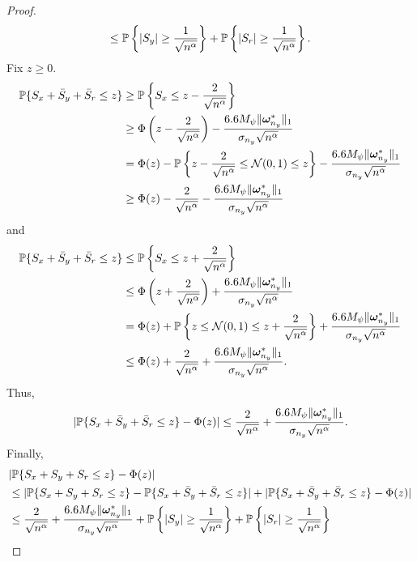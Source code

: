 \documentclass[11pt]{article}
\numberwithin{equation}{section}
\numberwithin{theorem}{section}
\def\fatomega{\boldsymbol{\omega}}
\theoremstyle{definition}
\theoremstyle{remark}
\begin{document}
\begin{proof}
\begin{equation}
\leq \mathbb{P}\left\{ |S_y| \geq \frac{1}{\sqrt{n^\alpha}} \right\} + \mathbb{P}\left\{ |S_r|
\geq \frac{1}{\sqrt{n^\alpha}} \right\}.
\end{equation}
Fix $z \geq 0$.
\begin{equation}
\begin{aligned}
\PP\{ S_x + \bar S_y + \bar S_r \leq z \}
&\geq \PP\left\{ S_x \leq z - \frac{2}{\sqrt{n^\alpha}} \right\} \\
&\geq \Phi\left(z - \frac{2}{\sqrt{n^\alpha}} \right) - \frac{6.6 M_\psi \|\fatomega_{n_y}^*\|_1}{\sigma_{n_y} \sqrt{n^\alpha}} \\
&= \Phi(z) - \PP\left\{ z - \frac{2}{\sqrt{n^\alpha}} \leq \Ncal(0,1) \leq z \right\} - \frac{6.6 M_\psi \|\fatomega_{n_y}^*\|_1}{\sigma_{n_y} \sqrt{n^\alpha}} \\
&\geq \Phi(z) - \frac{2}{\sqrt{n^\alpha}} - \frac{6.6 M_\psi \|\fatomega_{n_y}^*\|_1}{\sigma_{n_y} \sqrt{n^\alpha}}
\end{aligned}
\end{equation}
and
\begin{equation}
\begin{aligned}
\PP\{ S_x + \bar S_y + \bar S_r \leq z \}
&\leq \PP\left\{ S_x \leq z + \frac{2}{\sqrt{n^\alpha}} \right\} \\
&\leq \Phi\left(z + \frac{2}{\sqrt{n^\alpha}} \right) + \frac{6.6 M_\psi \|\fatomega_{n_y}^*\|_1}{\sigma_{n_y} \sqrt{n^\alpha}} \\
&= \Phi(z) + \PP\left\{ z \leq \Ncal(0,1) \leq z + \frac{2}{\sqrt{n^\alpha}} \right\} + \frac{6.6 M_\psi \|\fatomega_{n_y}^*\|_1}{\sigma_{n_y} \sqrt{n^\alpha}} \\
&\leq \Phi(z) + \frac{2}{\sqrt{n^\alpha}} + \frac{6.6 M_\psi \|\fatomega_{n_y}^*\|_1}{\sigma_{n_y} \sqrt{n^\alpha}}.
\end{aligned}
\end{equation}
Thus,
\begin{equation}
|\PP\{ S_x + \bar S_y + \bar S_r \leq z \} - \Phi(z)|
\leq \frac{2}{\sqrt{n^\alpha}} + \frac{6.6 M_\psi \|\fatomega_{n_y}^*\|_1}{\sigma_{n_y} \sqrt{n^\alpha}}.
\end{equation}
Finally,
\begin{equation}
\begin{aligned}
& |\PP\{ S_x + S_y + S_r \leq z \} - \Phi(z)| \\
&\leq |\PP\{ S_x + S_y + S_r \leq z \} - \PP\{ S_x + \bar S_y + \bar S_r \leq z \}| + |\PP\{ S_x + \bar S_y + \bar S_r \leq z \} - \Phi(z)| \\
&\leq \frac{2}{\sqrt{n^\alpha}} + \frac{6.6 M_\psi \|\fatomega_{n_y}^*\|_1}{\sigma_{n_y} \sqrt{n^\alpha}} + \PP\left\{ |S_y| \geq \frac{1}{\sqrt{n^\alpha}} \right\} + \PP\left\{ |S_r| \geq \frac{1}{\sqrt{n^\alpha}} \right\} \\

\end{aligned}
\end{equation}
\end{proof}
\end{document}
